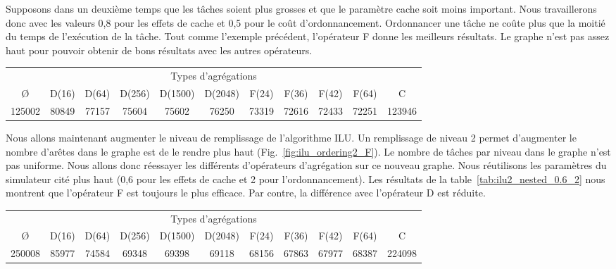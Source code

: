 Supposons dans un deuxième temps que les tâches soient plus grosses et que le paramètre cache soit moins important.
%
Nous travaillerons donc avec les valeurs 0,8 pour les effets de cache et 0,5 pour le coût d'ordonnancement.
%
Ordonnancer une tâche ne coûte plus que la moitié du temps de l'exécution de la tâche.
%
Tout comme l'exemple précédent, l'opérateur F donne les meilleurs résultats.
%
Le graphe n'est pas assez haut pour pouvoir obtenir de bons résultats avec les autres opérateurs.


\begin{center}
  \begin{tabular}{|c|c|c|c|c|c|c|c|c|c|c|}
    \hline
    \multicolumn{11}{|c|}{Types d'agrégations}\\
    \O & D(16) & D(64) & D(256) & D(1500) & D(2048) & F(24) & F(36) & F(42) & F(64) & C \\
    \hline
    125002 & 80849 & 77157 & 75604 & 75602 & 76250 & 73319 & 72616 & 72433 & 72251 & 123946 \\
    \hline
  \end{tabular}
  \label{tab:ilu0_nested_0.8_0.5}
\end{center}


Nous allons maintenant augmenter le niveau de remplissage de l'algorithme ILU.
%
Un remplissage de niveau 2 permet d'augmenter le nombre d'arêtes dans le graphe est de le rendre plus haut (Fig.~\ref{fig:ilu_ordering2_F}).
%
Le nombre de tâches par niveau dans le graphe n'est pas uniforme.
%
Nous allons donc réessayer les différents d'opérateurs d'agrégation sur ce nouveau graphe.
%
Nous réutilisons les paramètres du simulateur cité plus haut (0,6 pour les effets de cache et 2 pour l'ordonnancement).
%
Les résultats de la table~\ref{tab:ilu2_nested_0.6_2} nous montrent que l'opérateur F est toujours le plus efficace.
%
Par contre, la différence avec l'opérateur D est réduite.


\begin{center}
  \begin{tabular}{|c|c|c|c|c|c|c|c|c|c|c|}
    \hline
    \multicolumn{11}{|c|}{Types d'agrégations}\\
    \O & D(16) & D(64) & D(256) & D(1500) & D(2048) & F(24) & F(36) & F(42) & F(64) & C \\
    \hline
    250008 & 85977 & 74584 & 69348 & 69398 & 69118 & 68156 & 67863 & 67977 & 68387 & 224098 \\
    \hline
  \end{tabular}
  \label{tab:ilu2_nested_0.6_2}
\end{center}


